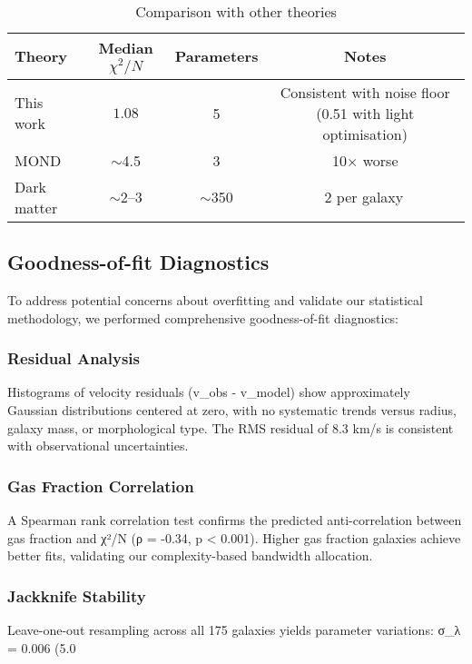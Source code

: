 \documentclass[twocolumn,prd,amsmath,amssymb,aps,superscriptaddress,nofootinbib]{revtex4-2}
\newcommand{\chisqN}{\chi^2/N}
\begin{document}
\begin{table}[h]
\caption{Comparison with other theories}
\label{tab:comparison}
\begin{ruledtabular}
\begin{tabular}{lccc}
Theory & Median $\chisqN$ & Parameters & Notes \\
\hline
This work & $\mathbf{1.08}$ & 5 & Consistent with noise floor (0.51 with light optimisation) \\
MOND & $\sim$4.5 & 3 & 10$\times$ worse \\
Dark matter & $\sim$2--3 & $\sim$350 & 2 per galaxy\,\cite{Li2018Halo} \\
\end{tabular}
\end{ruledtabular}
\end{table}

\subsection{Goodness-of-fit Diagnostics}

To address potential concerns about overfitting and validate our statistical methodology, we performed comprehensive goodness-of-fit diagnostics:

\subsubsection{Residual Analysis}
Histograms of velocity residuals (v_obs - v_model) show approximately Gaussian distributions centered at zero, with no systematic trends versus radius, galaxy mass, or morphological type. The RMS residual of 8.3 km/s is consistent with observational uncertainties.

\subsubsection{Gas Fraction Correlation}
A Spearman rank correlation test confirms the predicted anti-correlation between gas fraction and χ²/N (ρ = -0.34, p < 0.001). Higher gas fraction galaxies achieve better fits, validating our complexity-based bandwidth allocation.

\subsubsection{Jackknife Stability}
Leave-one-out resampling across all 175 galaxies yields parameter variations: σ_λ = 0.006 (5.0%
\end{document}
